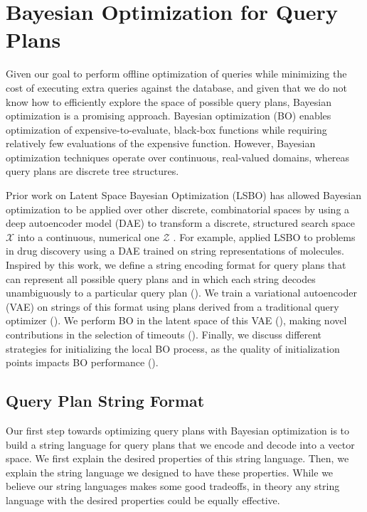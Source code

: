 \section{Bayesian Optimization for Query Plans}
\label{sec:technique}

Given our goal to perform offline optimization of queries while minimizing the cost of executing extra queries against the database, and given that we do not know how to efficiently explore the space of possible query plans, Bayesian optimization is a promising approach. Bayesian optimization (BO) enables optimization of expensive-to-evaluate, black-box functions while requiring relatively few evaluations of the expensive function. However, Bayesian optimization techniques operate over continuous, real-valued domains, whereas query plans are discrete tree structures.

Prior work on Latent Space Bayesian Optimization (LSBO)
has allowed Bayesian optimization to be applied over other discrete, combinatorial spaces by using a deep autoencoder model (DAE) to transform a discrete, structured search space $\mathcal{X}$ into a continuous, numerical one $\mathcal{Z}$ \cite{Weighted_Retraining,ladder,gomez2018automatic,Huawei,eissman2018bayesian,kajino2019molecular, lolbo}.
For example, \citet{lolbo} applied LSBO to problems in drug discovery using a DAE trained on string representations of molecules. 
Inspired by this work, we define a string encoding format for query plans that can represent all possible query plans and in which each string decodes unambiguously to a particular query plan (). We train a variational autoencoder (VAE) on strings of this format using plans derived from a traditional query optimizer (). We perform BO in the latent space of this VAE (), making novel contributions in the selection of timeouts (). Finally, we discuss different strategies for initializing the local BO process, as the quality of initialization points impacts BO performance ().

\subsection{Query Plan String Format}
\label{sec:string-format}
Our first step towards optimizing query plans with Bayesian optimization is to build a string language for query plans that we encode and decode into a vector space. We first explain the desired properties of this string language. Then, we explain the string language we designed to have these properties. While we believe our string languages makes some good tradeoffs, in theory any string language with the desired properties could be equally effective.

